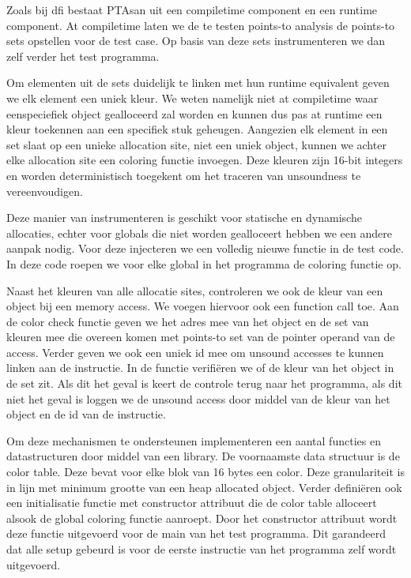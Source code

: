 \documentclass[conference]{IEEEtran}
\begin{document}
Zoals bij \gls{dfi} bestaat PTAsan uit een compiletime component en een runtime component. At compiletime laten we de te testen points-to analysis de points-to sets opstellen voor de test case. Op basis van deze sets instrumenteren we dan zelf verder het test programma. 

Om elementen uit de sets duidelijk te linken met hun runtime equivalent geven we elk element een uniek kleur. We weten namelijk niet at compiletime waar eenspeciefiek object gealloceerd zal worden en kunnen dus pas at runtime een kleur toekennen aan een specifiek stuk geheugen. Aangezien elk element in een set slaat op een unieke allocation site, niet een uniek object, kunnen we achter elke allocation site een coloring functie invoegen. Deze kleuren zijn 16-bit integers en worden deterministisch toegekent om het traceren van unsoundness te vereenvoudigen.

Deze manier van instrumenteren is geschikt voor statische en dynamische allocaties, echter voor globals die niet worden gealloceert hebben we een andere aanpak nodig. Voor deze injecteren we een volledig nieuwe functie in de test code. In deze code roepen we voor elke global in het programma de coloring functie op. 

Naast het kleuren van alle allocatie sites, controleren we ook de kleur van een object bij een memory access. We voegen hiervoor ook een function call toe. Aan de color check functie geven we het adres mee van het object en de set van kleuren mee die overeen komen met points-to set van de pointer operand van de access. Verder geven we ook een uniek id mee om unsound accesses te kunnen linken aan de instructie. In de functie verifiëren we of de kleur van het object in de set zit. Als dit het geval is keert de controle terug naar het programma, als dit niet het geval is loggen we de unsound access door middel van de kleur van het object en de id van de instructie.

Om deze mechanismen te ondersteunen implementeren een aantal functies en datastructuren door middel van een library. De voornaamste data structuur is de color table. Deze bevat voor elke blok van 16 bytes een color. Deze granulariteit is in lijn met minimum grootte van een heap allocated object. Verder definiëren ook een initialisatie functie met constructor attribuut die de color table alloceert alsook de global coloring functie aanroept. Door het constructor attribuut wordt deze functie uitgevoerd voor de main van het test programma. Dit garandeerd dat alle setup gebeurd is voor de eerste instructie van het programma zelf wordt uitgevoerd.
\end{document}
